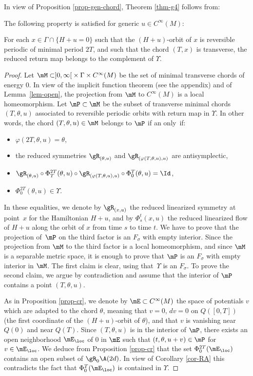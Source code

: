 In view of Proposition \ref{prop-gen-chord}, Theorem \ref{thm-g4} follows from:

\begin{prop}
The following property is satisfied for generic $u\in C^{\infty}(M)$:

For each $x\in \Gamma\cap\{H+u=0\}$ such that the $(H+u)$-orbit of $x$ is reversible periodic of minimal period $2T$, and such that
the chord $(T,x)$ is transverse, the reduced return map belongs to the complement of $\Upsilon$.
\end{prop}

\begin{proof}
Let $\mM\subset ]0,\infty[{}\times \Gamma\times C^{\infty}(M)$ be the set of
minimal transverse chords of energy $0$.
In view of the implicit function theorem (see the appendix) and of
Lemma~\ref{lem-open}, the projection from $\mM$ to $C^{\infty}(M)$ is a local homeomorphism. Let $\mP\subset \mM$ be the subset of transverse minimal chords $(T,\theta, u)$
associated to reversible periodic orbits with return map in $\Upsilon$. In other words, the chord
$(T,\theta,u)\in \mM$ belongs to $\mP$ if an only~if:
\begin{itemize}
\item $\varphi(2T,\theta, u)=\theta$,
\item the reduced symmetries $\gR_{(\theta,u)}$ and $\gR_{(\varphi(T,\theta,u),u)}$ are antisymplectic,
\item $\gR_{(\theta,u)}\circ \Phi^{2T}_T(\theta, u)\circ
\gR_{(\varphi(T,\theta,u),u)}\circ \Phi_0^T(\theta, u)=\Id$,
\item $\Phi _0^{2T}(\theta,u)\in \Upsilon$.
\end{itemize}
In these equalities, we denote by $\gR_{(x,u)}$ the reduced linearized symmetry at point~$x$ for the Hamiltonian $H+u$, and by
$\Phi_s^t(x,u)$ the reduced linearized flow of $H+u$ along the orbit of $x$ from time $s$ to time $t$.
We have to prove that the projection of~$\mP$ on the third factor is an $F_{\sigma}$
with empty interior.
Since the projection from $\mM$ to the third factor is a local homeomorphism, and since $\mM$ is a separable metric space,
it is enough to prove that $\mP$ is
an $F_{\sigma}$ with empty interior in $\mM$. The first claim is clear, using that~$\Upsilon$ is an $F_{\sigma}$.
To prove the second claim, we argue by contradiction and assume that the interior of $\mP$ contains a point $(T, \theta, u)$.

As in Proposition \ref{prop-cr}, we denote by $\mE\subset C^{\infty}(M)$ the space of potentials $v$ which are adapted to the chord
$\theta$, meaning that $v=0$, $dv=0$ on $Q([0,T])$ (the first coordinate of the $(H+u)$-orbit of $\theta$), and that $v$ is vanishing near
$Q(0)$ and near $Q(T)$. Since $(T,\theta, u)$ is in the interior of $\mP$, there exists an open neighborhood $\mE_{\loc}$ of $0$
in $\mE$ such that $(t,\theta, u+v)\in \mP$ for $v\in \mE_{\loc}$. We deduce
from Proposition \ref{prop-cr}
that the set
$\Phi_0^{2T} (\mE_{\loc})$ contains an open subset of $\gR_{0}\A(2d)$.
In view of Corollary \ref{cor-RA}
this contradicts the fact that $\Phi_0^T(\mE_{\loc})$ is contained in $\Upsilon$.
\end{proof}

